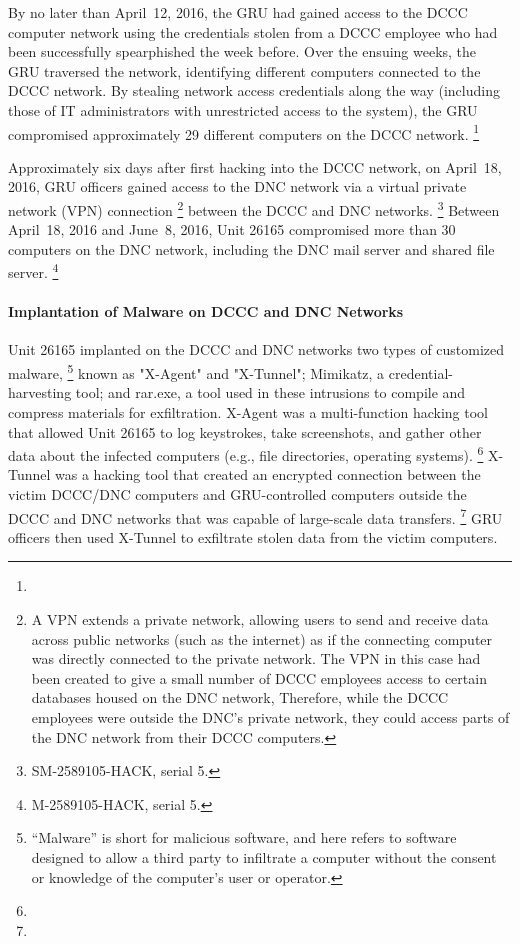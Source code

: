 By no later than April~12, 2016, the GRU had gained access to the DCCC computer network using the credentials stolen from a DCCC employee who had been successfully spearphished the week before.
Over the ensuing weeks, the GRU traversed the network, identifying different computers connected to the DCCC network.
By stealing network access credentials along the way (including those of IT administrators with unrestricted access to the system), the GRU compromised approximately 29 different computers on the DCCC network.%
\footnote{}

Approximately six days after first hacking into the DCCC network, on April~18, 2016, GRU officers gained access to the DNC network via a virtual private network (VPN) connection%
\footnote{A VPN extends a private network, allowing users to send and receive data across public networks (such as the internet) as if the connecting computer was directly connected to the private network.
The VPN in this case had been created to give a small number of DCCC employees access to certain databases housed on the DNC network, Therefore, while the DCCC employees were outside the DNC's private network, they could access parts of the DNC network from their DCCC computers.}
between the DCCC and DNC networks.%
\footnote{ SM-2589105-HACK, serial 5.}
Between April~18, 2016 and June~8, 2016, Unit 26165 compromised more than 30 computers on the DNC network, including the DNC mail server and shared file server.%
\footnote{ M-2589105-HACK, serial 5.}

\paragraph{Implantation of Malware on DCCC and DNC Networks}

Unit 26165 implanted on the DCCC and DNC networks two types of customized malware,%
\footnote{``Malware'' is short for malicious software, and here refers to software designed to allow a third party to infiltrate a computer without the consent or knowledge of the computer's user or operator.}
known as "X-Agent" and "X-Tunnel";  Mimikatz, a credential-harvesting tool; and rar.exe, a tool used in these intrusions to compile and compress materials for exfiltration.
X-Agent was a multi-function hacking tool that allowed Unit 26165 to log keystrokes, take screenshots, and gather other data about the infected computers (e.g., file directories,  operating systems).%
\footnote{}
X-Tunnel was a  hacking tool that created an encrypted connection between the victim DCCC/DNC computers and GRU-controlled computers outside the DCCC and DNC networks that was capable of large-scale data transfers.%
\footnote{}
GRU officers then used X-Tunnel to exfiltrate stolen data from the victim computers.

